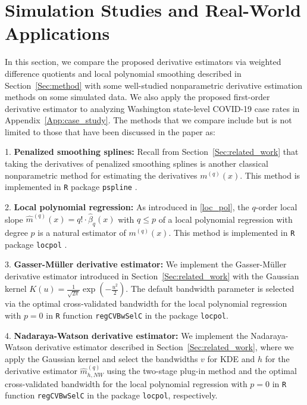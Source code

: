 \documentclass{uwstat572}
\theoremstyle{definition}
\renewcommand{\hat}{\widehat}
\theoremstyle{theorem}
\begin{document}
\section{Simulation Studies and Real-World Applications}
\label{Sec:experiments}

In this section, we compare the proposed derivative estimators via weighted difference quotients and local polynomial smoothing described in Section~\ref{Sec:method} with some well-studied nonparametric derivative estimation methods on some simulated data. We also apply the proposed first-order derivative estimator to analyzing Washington state-level COVID-19 case rates in Appendix~\ref{App:case_study}. The methods that we compare include but is not limited to those that have been discussed in the paper as:
	
1. {\bf Penalized smoothing splines:} Recall from Section~\ref{Sec:related_work} that taking the derivatives of penalized smoothing splines is another classical nonparametric method for estimating the derivatives $m^{(q)}(x)$. This method is implemented in \texttt{R} package \texttt{pspline} \citep{pspline2022R}.

2. {\bf Local polynomial regression:} As introduced in \eqref{loc_pol}, the $q$-order local slope $\hat{m}^{(q)}(x) = q!\cdot\hat{\beta}_q(x)$ with $q\leq p$ of a local polynomial regression with degree $p$ is a natural estimator of $m^{(q)}(x)$. This method is implemented in \texttt{R} package \texttt{locpol} \citep{locpol2022R}.
	
3. {\bf Gasser-M{\"u}ller derivative estimator:} We implement the Gasser-M{\"u}ller derivative estimator introduced in Section~\ref{Sec:related_work} with the Gaussian kernel $K(u)=\frac{1}{\sqrt{2\pi}} \exp\left(-\frac{u^2}{2}\right)$. The default bandwidth parameter is selected via the optimal cross-validated bandwidth for the local polynomial regression with $p=0$ in \texttt{R} function \texttt{regCVBwSelC} in the package \texttt{locpol}.
	
4. {\bf Nadaraya-Watson derivative estimator:} We implement the Nadaraya-Watson derivative estimator described in Section~\ref{Sec:related_work}, where we apply the Gaussian kernel and select the bandwidths $v$ for KDE and $h$ for the derivative estimator $\hat{m}_{h,NW}^{(q)}$ using the two-stage plug-in method \citep{sheather1991reliable} and the optimal cross-validated bandwidth for the local polynomial regression with $p=0$ in \texttt{R} function \texttt{regCVBwSelC} in the package \texttt{locpol}, respectively.
\end{document}
